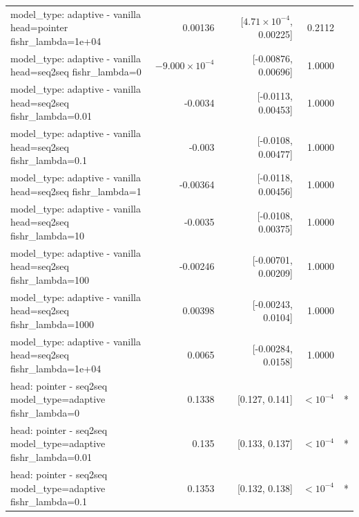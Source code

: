 \documentclass[10pt]{article}
\makeatletter
\newcommand{\stackcell}[1]{\begin{tabular}[t]{@{}l@{}}#1\end{tabular}}
\makeatother
\begin{document}
{\begin{longtable}{lrrrl}
\stackcell{model\_type: adaptive - vanilla\\\footnotesize head=pointer fishr\_lambda=1e+04 } & 0.00136 & [$4.71\times10^{-4}$, 0.00225] & 0.2112 & \\
\stackcell{model\_type: adaptive - vanilla\\\footnotesize head=seq2seq fishr\_lambda=0 } & $-9.000\times10^{-4}$ & [-0.00876, 0.00696] & 1.0000 & \\
\stackcell{model\_type: adaptive - vanilla\\\footnotesize head=seq2seq fishr\_lambda=0.01 } & -0.0034 & [-0.0113, 0.00453] & 1.0000 & \\
\stackcell{model\_type: adaptive - vanilla\\\footnotesize head=seq2seq fishr\_lambda=0.1 } & -0.003 & [-0.0108, 0.00477] & 1.0000 & \\
\stackcell{model\_type: adaptive - vanilla\\\footnotesize head=seq2seq fishr\_lambda=1 } & -0.00364 & [-0.0118, 0.00456] & 1.0000 & \\
\stackcell{model\_type: adaptive - vanilla\\\footnotesize head=seq2seq fishr\_lambda=10 } & -0.0035 & [-0.0108, 0.00375] & 1.0000 & \\
\stackcell{model\_type: adaptive - vanilla\\\footnotesize head=seq2seq fishr\_lambda=100 } & -0.00246 & [-0.00701, 0.00209] & 1.0000 & \\
\stackcell{model\_type: adaptive - vanilla\\\footnotesize head=seq2seq fishr\_lambda=1000 } & 0.00398 & [-0.00243, 0.0104] & 1.0000 & \\
\stackcell{model\_type: adaptive - vanilla\\\footnotesize head=seq2seq fishr\_lambda=1e+04 } & 0.0065 & [-0.00284, 0.0158] & 1.0000 & \\
\stackcell{head: pointer - seq2seq\\\footnotesize model\_type=adaptive fishr\_lambda=0 } & 0.1338 & [0.127, 0.141] & $<10^{-4}$ & *\\
\stackcell{head: pointer - seq2seq\\\footnotesize model\_type=adaptive fishr\_lambda=0.01 } & 0.135 & [0.133, 0.137] & $<10^{-4}$ & *\\
\stackcell{head: pointer - seq2seq\\\footnotesize model\_type=adaptive fishr\_lambda=0.1 } & 0.1353 & [0.132, 0.138] & $<10^{-4}$ & *\\

\end{longtable}}
\end{document}
